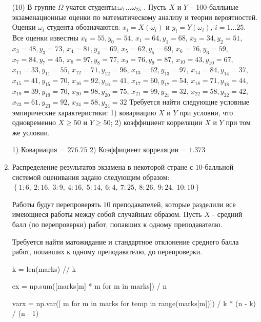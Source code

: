 \documentclass[a4paper,14pt]{article}
\begin{document}
\begin{enumerate}
(10) В группе $\Omega$ учатся студенты:$\omega _{1}...\omega _{25}$ . Пусть $X$ и $Y$ – 100-балльные экзаменационные оценки по
математическому анализу и теории вероятностей. Оценки $\omega _{i}$ студента обозначаются: $x _{i} = X(\omega _{i})$ и $y _{i} = Y(\omega _{i})$, $i = 1...25$. Все оценки известны
$x _{0} = 55, y _{0} = 54$, $x _{1} = 64, y _{1} = 68$, $x _{2} = 34, y _{2} = 51$, $x _{3} = 48, y _{3} = 73$, $x _{4} = 81, y _{4} = 69$, $x _{5} = 62, y _{5} = 69$, $x _{6} = 76, y _{6} = 59$, $x _{7} = 84, y _{7} = 45$, $x _{8} = 97, y _{8} = 77$, $x _{9} = 76, y _{9} = 87$, $x _{10} = 43, y _{10} = 67$, $x _{11} = 33, y _{11} = 55$, $x _{12} = 71, y _{12} = 96$, $x _{13} = 62, y _{13} = 97$, $x _{14} = 84, y _{14} = 37$, $x _{15} = 41, y _{15} = 70$, $x _{16} = 92, y _{16} = 41$, $x _{17} = 60, y _{17} = 54$, $x _{18} = 71, y _{18} = 44$, $x _{19} = 39, y _{19} = 70$, $x _{20} = 98, y _{20} = 75$, $x _{21} = 99, y _{21} = 32$, $x _{22} = 58, y _{22} = 42$, $x _{23} = 61, y _{23} = 92$, $x _{24} = 58, y _{24} = 32$
Требуется
найти следующие условные эмпирические характеристики: 1) ковариацию $X$ и $Y$ при условии, что одновременно $X \geqslant 50$
 и $Y \geqslant 50$; 2) коэффициент корреляции $X$ и $Y$ при том же условии.




1) Ковариация = $276.75$
2) Коэффициент корреляции = $1.373$


\item

    
    	Распределение результатов экзамена в некоторой стране с $10$-балльной системой оценивания задано следующим образом:
    	$\left\{ 1 : 6, \  2 : 16, \  3 : 9, \  4 : 16, \  5 : 14, \  6 : 4, \  7 : 25, \  8 : 26, \  9 : 24, \  10 : 10\right\}$

	Работы будут перепроверять $10$ преподавателей, которые разделили все имеющиеся работы между собой случайным образом. Пусть $\overline{X}$ - средний балл (по перепроверки) работ, попавших к одному преподавателю.

	Требуется найти матожидание и стандартное отклонение среднего балла работ, попавших к одному преподавателю, до перепроверки.
    


    


    k = len(marks) // k

    ex = np.sum([marks[m] * m for m in marks]) / n

    varx = np.var([ m for m in marks for temp in range(marks[m])]) / k * (n - k) / (n - 1)


\end{enumerate}
\end{document}
